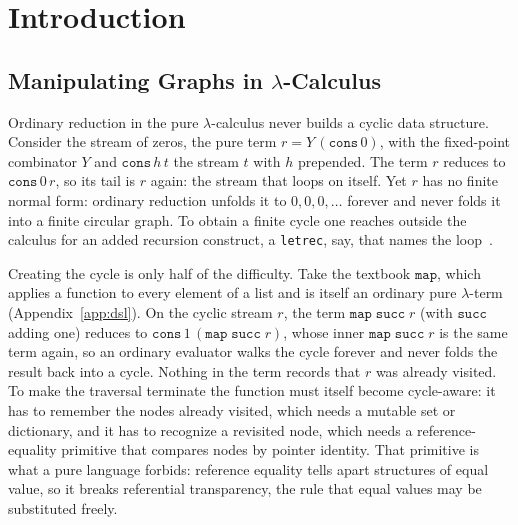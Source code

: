 \fi %

\maketitle

\ifColambdaBody
\section{Introduction}\label{sec:intro}

\subsection{Manipulating Graphs in $\lambda$-Calculus}

Ordinary reduction in the pure $\lambda$-calculus never builds a cyclic data structure. Consider the stream of zeros, the pure term $r = Y\,(\mathtt{cons}\,0)$, with the fixed-point combinator $Y$ and $\mathtt{cons}\,h\,t$ the stream $t$ with $h$ prepended. The term $r$ reduces to $\mathtt{cons}\,0\,r$, so its tail is $r$ again: the stream that loops on itself. Yet $r$ has no finite normal form: ordinary reduction unfolds it to $0,0,0,\dots$ forever and never folds it into a finite circular graph. To obtain a finite cycle one reaches outside the calculus for an added recursion construct, a \texttt{letrec}, say, that names the loop~\cite{ariola1997-explicit-recursion}.

Creating the cycle is only half of the difficulty. Take the textbook $\mathtt{map}$, which applies a function to every element of a list and is itself an ordinary pure $\lambda$-term (Appendix~\ref{app:dsl}). On the cyclic stream $r$, the term $\mathtt{map}\;\mathtt{succ}\;r$ (with $\mathtt{succ}$ adding one) reduces to $\mathtt{cons}\,1\,(\mathtt{map}\;\mathtt{succ}\;r)$, whose inner $\mathtt{map}\;\mathtt{succ}\;r$ is the same term again, so an ordinary evaluator walks the cycle forever and never folds the result back into a cycle. Nothing in the term records that $r$ was already visited. To make the traversal terminate the function must itself become cycle-aware: it has to remember the nodes already visited, which needs a mutable set or dictionary, and it has to recognize a revisited node, which needs a reference-equality primitive that compares nodes by pointer identity. That primitive is what a pure language forbids: reference equality tells apart structures of equal value, so it breaks referential transparency, the rule that equal values may be substituted freely.

